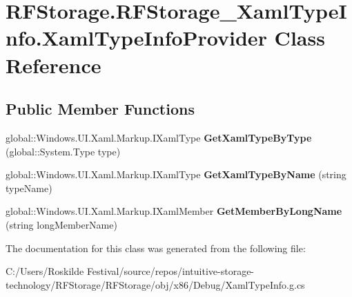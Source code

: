 \section{R\+F\+Storage.\+R\+F\+Storage\+\_\+\+Xaml\+Type\+Info.\+Xaml\+Type\+Info\+Provider Class Reference}
\label{class_r_f_storage_1_1_r_f_storage___xaml_type_info_1_1_xaml_type_info_provider}
\subsection*{Public Member Functions}
\begin{DoxyCompactItemize}
\item 
\mbox{\label{class_r_f_storage_1_1_r_f_storage___xaml_type_info_1_1_xaml_type_info_provider_af7658c874e266cd4866d15b7157f3da8}} 
global\+::\+Windows.\+U\+I.\+Xaml.\+Markup.\+I\+Xaml\+Type {\bfseries Get\+Xaml\+Type\+By\+Type} (global\+::\+System.\+Type type)
\item 
\mbox{\label{class_r_f_storage_1_1_r_f_storage___xaml_type_info_1_1_xaml_type_info_provider_a800eef5554a5dbd8914eaebf883c4afa}} 
global\+::\+Windows.\+U\+I.\+Xaml.\+Markup.\+I\+Xaml\+Type {\bfseries Get\+Xaml\+Type\+By\+Name} (string type\+Name)
\item 
\mbox{\label{class_r_f_storage_1_1_r_f_storage___xaml_type_info_1_1_xaml_type_info_provider_a9101b0a1303b7b1a4891a3e8988225d2}} 
global\+::\+Windows.\+U\+I.\+Xaml.\+Markup.\+I\+Xaml\+Member {\bfseries Get\+Member\+By\+Long\+Name} (string long\+Member\+Name)
\end{DoxyCompactItemize}


The documentation for this class was generated from the following file\+:\begin{DoxyCompactItemize}
\item 
C\+:/\+Users/\+Roskilde Festival/source/repos/intuitive-\/storage-\/technology/\+R\+F\+Storage/\+R\+F\+Storage/obj/x86/\+Debug/Xaml\+Type\+Info.\+g.\+cs\end{DoxyCompactItemize}
